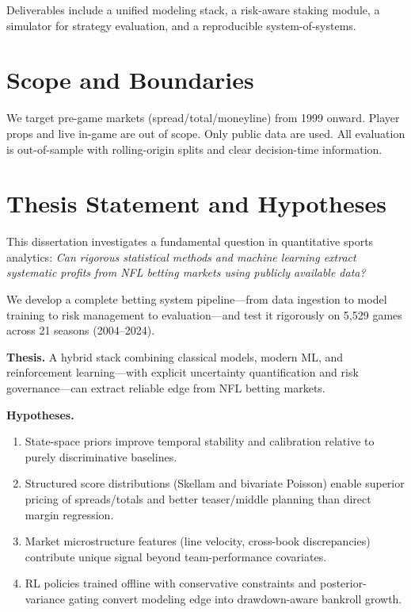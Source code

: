 \noindent Deliverables include a unified modeling stack, a risk-aware staking module, a simulator for strategy evaluation, and a reproducible system-of-systems.


\section{Scope and Boundaries}
We target pre-game markets (spread/total/moneyline) from 1999 onward. Player props and live in-game are out of scope. Only public data are used. All evaluation is out-of-sample with rolling-origin splits and clear decision-time information.

\section{Thesis Statement and Hypotheses}

This dissertation investigates a fundamental question in quantitative sports analytics: \textit{Can rigorous statistical methods and machine learning extract systematic profits from NFL betting markets using publicly available data?}

We develop a complete betting system pipeline—from data ingestion to model training to risk management to evaluation—and test it rigorously on 5,529 games across 21 seasons (2004--2024).

\textbf{Thesis.} A hybrid stack combining classical models, modern ML, and reinforcement learning—with explicit uncertainty quantification and risk governance—can extract reliable edge from NFL betting markets.

\textbf{Hypotheses.}
\begin{enumerate}
  \item State-space priors improve temporal stability and calibration relative to purely discriminative baselines.
  \item Structured score distributions (Skellam and bivariate Poisson) enable superior pricing of spreads/totals and better teaser/middle planning than direct margin regression.
  \item Market microstructure features (line velocity, cross-book discrepancies) contribute unique signal beyond team-performance covariates.
  \item RL policies trained offline with conservative constraints and posterior-variance gating convert modeling edge into drawdown-aware bankroll growth.
\end{enumerate}

